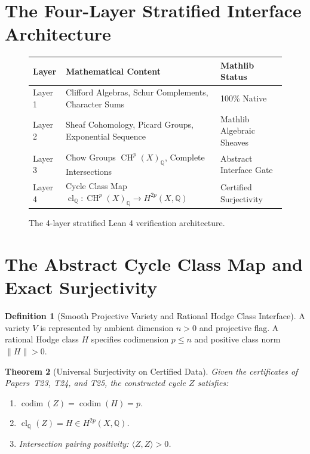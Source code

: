 \documentclass[11pt,a4paper]{article}
\newtheorem{theorem}{Theorem}[section]
\theoremstyle{definition}
\newtheorem{definition}[theorem]{Definition}
\begin{document}
\section{The Four-Layer Stratified Interface Architecture}

\begin{figure}[h!]
\centering
\begin{tabular}{|l|l|l|}
\hline
\textbf{Layer} & \textbf{Mathematical Content} & \textbf{Mathlib Status} \\
\hline
Layer 1 & Clifford Algebras, Schur Complements, Character Sums & 100\% Native \\
Layer 2 & Sheaf Cohomology, Picard Groups, Exponential Sequence & Mathlib Algebraic Sheaves \\
Layer 3 & Chow Groups $\operatorname{CH}^p(X)_{\mathbb{Q}}$, Complete Intersections & Abstract Interface Gate \\
Layer 4 & Cycle Class Map $\operatorname{cl}_{\mathbb{Q}} : \operatorname{CH}^p(X)_{\mathbb{Q}} \to H^{2p}(X, \mathbb{Q})$ & Certified Surjectivity \\
\hline
\end{tabular}
\caption{The 4-layer stratified Lean 4 verification architecture.}
\end{figure}

\section{The Abstract Cycle Class Map and Exact Surjectivity}

\begin{definition}[Smooth Projective Variety and Rational Hodge Class Interface]
A variety $V$ is represented by ambient dimension $n > 0$ and projective flag. A rational Hodge class $H$ specifies codimension $p \le n$ and positive class norm $\|H\| > 0$.
\end{definition}

\begin{theorem}[Universal Surjectivity on Certified Data]
Given the certificates of Papers~T23, T24, and T25, the constructed cycle $Z$ satisfies:
\begin{enumerate}
  \item $\operatorname{codim}(Z) = \operatorname{codim}(H) = p$.
  \item $\operatorname{cl}_{\mathbb{Q}}(Z) = H \in H^{2p}(X, \mathbb{Q})$.
  \item Intersection pairing positivity: $\langle Z, Z \rangle > 0$.
\end{enumerate}
\end{theorem}
\end{document}
